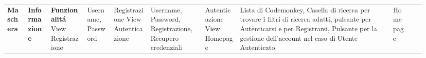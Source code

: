 \begin{center}




    \begin{adjustwidth}{-1.9cm}{0cm}
        \begin{longtable}
            {|>{\raggedright}m{3.5cm}|>{\raggedright}m{7.5cm}|>{\raggedright}m{3cm}|}
            \hline
            \n      {}
            \large \centering\textbf{Maschera}                   & \centering\large\textbf{Informazione}                                                                                                                                                                                                                                                                                                                                                         & \large\textbf{Funzionalitá}
            \endhead
            \hline  View Registrazione                           & Username, Password                                                                                                                                                                                                                                                                                                                                                                            & Registrazione
            \n      View Autenticazione                          & Username, Password, Registrazione, Recupero credenziali                                                                                                                                                                                                                                                                                                                                       & Autenticazione
            \n      View Homepage                                & Lista di Codemonkey, Casella di ricerca per trovare i filtri di ricerca adatti, pulsante per Autenticarsi e per Registrarsi, Pulsante per la gestione dell'account nel caso di Utente Autenticato                                                                                                                                                                                              & Homepage

\end{longtable}
\end{adjustwidth}
\end{center}
